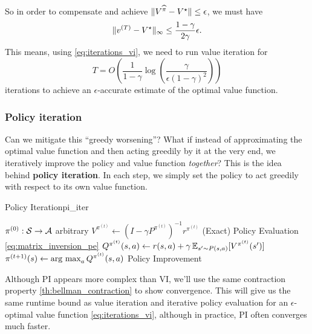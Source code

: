\documentclass[\main/main]{subfiles}
\begin{document}
So in order to compensate and achieve $\|V^{\widehat \pi} - V^\star\| \le \epsilon$, we must have
\[
    \|v^{(T)} - V^\star\|_{\infty} \le \frac{1-\gamma}{2 \gamma} \epsilon.
\]
This means, using \eqref{eq:iterations_vi}, we need to run value iteration for
\[
    T = O\left( \frac{1}{1-\gamma} \log\left(\frac{\gamma}{\epsilon (1-\gamma)^2}\right) \right)
\]
iterations to achieve an $\epsilon$-accurate estimate of the optimal value function.

\subsubsection{Policy iteration}

Can we mitigate this ``greedy worsening''? What if instead of approximating the optimal value function and then acting greedily by it at the very end, we iteratively improve the policy and value function \emph{together}? This is the idea behind \textbf{policy iteration}. In each step, we simply set the policy to act greedily with respect to its own value function.

\begin{definition}{Policy Iteration}{pi_iter}
\begin{algorithmic}
\State $\pi^{(0)} : \mathcal{S} \to \mathcal{A}$ arbitrary
    \State $V^{\pi^{(t)}} \gets (I - \gamma P^{\pi^{(t)}})^{-1} r^{\pi^{(t)}}$
    \Comment (Exact) Policy Evaluation \eqref{eq:matrix_inversion_pe}
    \State $Q^{\pi^{(t)}}(s, a) \gets r(s, a) + \gamma \operatorname*{\mathbb{E}}_{s' \sim P(s, a)} [V^{\pi^{(t)}} (s')]$
    \State $\pi^{(t+1)}(s) \gets \operatorname*{\textrm{arg\ max}}_a Q^{\pi^{(t)}} (s, a)$
    \Comment Policy Improvement
\EndFor
\end{algorithmic}
\end{definition}

Although PI appears more complex than VI, we'll use the same contraction property \eqref{th:bellman_contraction} to show convergence. This will give us the same runtime bound as value iteration and iterative policy evaluation for an $\epsilon$-optimal value function \eqref{eq:iterations_vi}, although in practice, PI often converges much faster.
\end{document}
